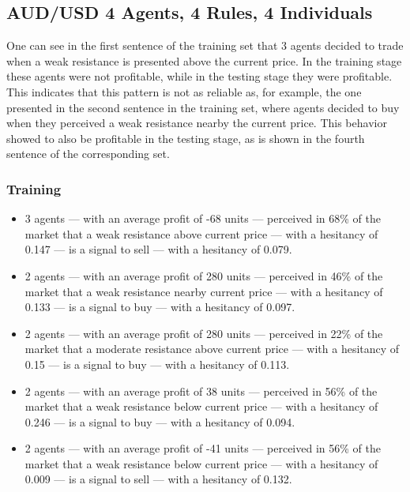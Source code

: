 
\subsection{AUD/USD 4 Agents, 4 Rules, 4 Individuals}

One can see in the first sentence of the training set that 3 agents decided to
trade when a weak resistance is presented above the current price. In the
training stage these agents were not profitable, while in the testing stage they
were profitable. This indicates that this pattern is not as reliable as, for
example, the one presented in the second sentence in the training set, where
agents decided to buy when they perceived a weak resistance nearby the current
price. This behavior showed to also be profitable in the testing stage, as is
shown in the fourth sentence of the corresponding set.

\subsubsection{Training}

{\small
  \begin{itemize}
  \item 3 agents — with an average profit of -68 units — perceived in 68\% of
    the market that a weak resistance above current price — with a hesitancy of
    0.147 — is a signal to sell — with a hesitancy of 0.079.
  \item 2 agents — with an average profit of 280 units — perceived in 46\% of
    the market that a weak resistance nearby current price — with a hesitancy of
    0.133 — is a signal to buy — with a hesitancy of 0.097.
  \item 2 agents — with an average profit of 280 units — perceived in 22\% of
    the market that a moderate resistance above current price — with a hesitancy
    of 0.15 — is a signal to buy — with a hesitancy of 0.113.
  \item 2 agents — with an average profit of 38 units — perceived in 56\% of the
    market that a weak resistance below current price — with a hesitancy of
    0.246 — is a signal to buy — with a hesitancy of 0.094.
  \item 2 agents — with an average profit of -41 units — perceived in 56\% of
    the market that a weak resistance below current price — with a hesitancy of
    0.009 — is a signal to sell — with a hesitancy of 0.132.
  \end{itemize}
}

